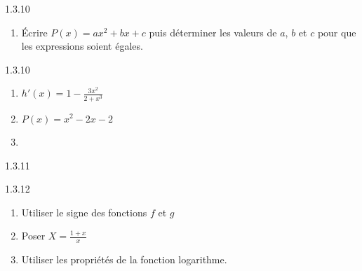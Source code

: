 \begin{Indication}{1.3.10}
	\begin{enumerate}
	\item[2.] Écrire $P(x)=ax^2+bx+c$ puis déterminer les valeurs de $a$, $b$ et $c$ pour que les expressions soient égales.
	\end{enumerate}
\end{Indication}
\begin{Solution}{1.3.10}
	\begin{enumerate}
		\item $h'(x)=1-\frac{3x^2}{2+x^3}$
		\item $P(x)=x^2-2x-2$
		\item {}
	\end{enumerate}
\end{Solution}
\begin{Solution}{1.3.11}
	\vspace{10pt}
\end{Solution}
\begin{Indication}{1.3.12}
	\begin{enumerate}
		\item[3.] Utiliser le signe des fonctions $f$ et $g$
		\item[4.] Poser $X=\frac{1+x}{x}$
		\item[5.] Utiliser les propriétés de la fonction logarithme.
	\end{enumerate}
\end{Indication}

